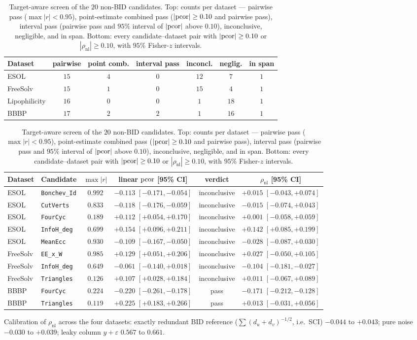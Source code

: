 \begin{table}[h]
\centering
\small
\caption{Target-aware screen of the $20$ non-BID candidates. Top: counts per dataset --- pairwise pass ($\max|r|<0.95$), point-estimate combined pass ($|\mathrm{pcor}|\ge0.10$ and pairwise pass), interval pass (pairwise pass and $95\%$ interval of $|\mathrm{pcor}|$ above $0.10$), inconclusive, negligible, and in span. Bottom: every candidate--dataset pair with $|\mathrm{pcor}|\ge0.10$ or $|\rho_{\mathrm{nl}}|\ge0.10$, with $95\%$ Fisher-$z$ intervals.}
\label{tab:nonbid}
\begin{tabular}{lcccccc}
\toprule
Dataset & pairwise & point comb. & interval pass & inconcl. & neglig. & in span\\
\midrule
ESOL & $15$ & $4$ & $0$ & $12$ & $7$ & $1$\\
FreeSolv & $15$ & $1$ & $0$ & $15$ & $4$ & $1$\\
Lipophilicity & $16$ & $0$ & $0$ & $1$ & $18$ & $1$\\
BBBP & $17$ & $2$ & $2$ & $1$ & $16$ & $1$\\
\bottomrule
\end{tabular}

\vspace{0.6em}
\setlength{\tabcolsep}{3pt}
\begin{tabular}{llcccc}
\toprule
Dataset & Candidate & $\max|r|$ & linear $\mathrm{pcor}$ [95\% CI] & verdict & $\rho_{\mathrm{nl}}$ [95\% CI]\\
\midrule
ESOL & \texttt{Bonchev\_Id} & $0.992$ & $-0.113$ $[-0.171,-0.054]$ & inconclusive & $+0.015$ $[-0.043,+0.074]$\\
ESOL & \texttt{CutVerts} & $0.833$ & $-0.118$ $[-0.176,-0.059]$ & inconclusive & $-0.015$ $[-0.074,+0.043]$\\
ESOL & \texttt{FourCyc} & $0.189$ & $+0.112$ $[+0.054,+0.170]$ & inconclusive & $+0.001$ $[-0.058,+0.059]$\\
ESOL & \texttt{InfoH\_deg} & $0.699$ & $+0.154$ $[+0.096,+0.211]$ & inconclusive & $+0.142$ $[+0.085,+0.199]$\\
ESOL & \texttt{MeanEcc} & $0.930$ & $-0.109$ $[-0.167,-0.050]$ & inconclusive & $-0.028$ $[-0.087,+0.030]$\\
FreeSolv & \texttt{EE\_x\_W} & $0.985$ & $+0.129$ $[+0.051,+0.206]$ & inconclusive & $+0.027$ $[-0.050,+0.105]$\\
FreeSolv & \texttt{InfoH\_deg} & $0.649$ & $-0.061$ $[-0.140,+0.018]$ & inconclusive & $-0.104$ $[-0.181,-0.027]$\\
FreeSolv & \texttt{Triangles} & $0.126$ & $+0.107$ $[+0.028,+0.184]$ & inconclusive & $+0.011$ $[-0.067,+0.089]$\\
BBBP & \texttt{FourCyc} & $0.224$ & $-0.220$ $[-0.261,-0.178]$ & pass & $-0.171$ $[-0.212,-0.128]$\\
BBBP & \texttt{Triangles} & $0.119$ & $+0.225$ $[+0.183,+0.266]$ & pass & $+0.013$ $[-0.031,+0.056]$\\
\bottomrule
\end{tabular}

\vspace{0.3em}
\noindent\footnotesize{Calibration of $\rho_{\mathrm{nl}}$ across the four datasets: exactly redundant BID reference ($\sum(d_u+d_v)^{-1/2}$, i.e.\ SCI) $-0.044$ to $+0.043$; pure noise $-0.030$ to $+0.039$; leaky column $y+\varepsilon$ $0.567$ to $0.661$.}
\end{table}
